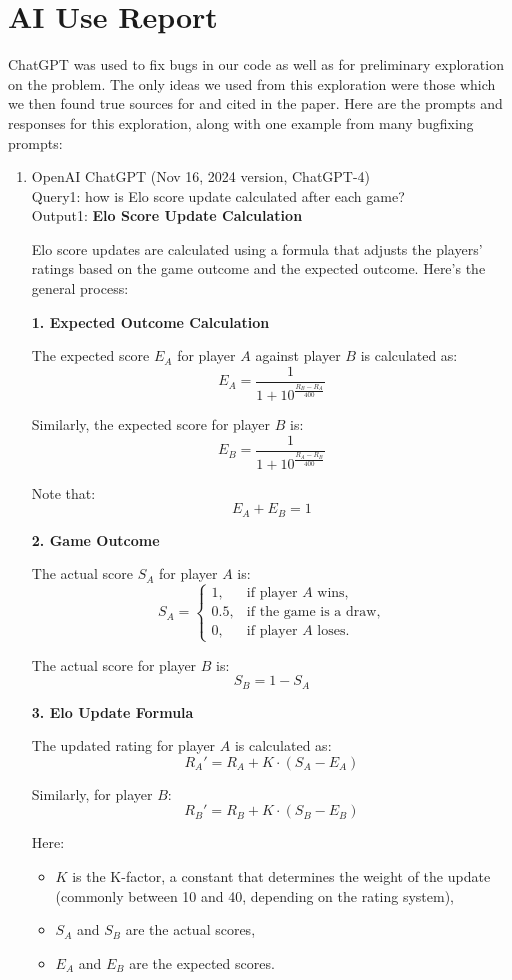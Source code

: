 \section{AI Use Report}
ChatGPT was used to fix bugs in our code as well as for preliminary exploration on the problem. The only ideas we used from this exploration were those which we then found true sources for and cited in the paper. Here are the prompts and responses for this exploration, along with one example from many bugfixing prompts:
\begin{enumerate}
\item OpenAI ChatGPT (Nov 16, 2024 version, ChatGPT-4) \\
Query1: how is Elo score update calculated after each game? \\
Output1: \textbf{Elo Score Update Calculation}

Elo score updates are calculated using a formula that adjusts the players' ratings based on the game outcome and the expected outcome. Here's the general process:

\textbf{1. Expected Outcome Calculation}

The expected score $E_A$ for player $A$ against player $B$ is calculated as:
\[
E_A = \frac{1}{1 + 10^{\frac{R_B - R_A}{400}}}
\]

Similarly, the expected score for player $B$ is:
\[
E_B = \frac{1}{1 + 10^{\frac{R_A - R_B}{400}}}
\]

Note that:
\[
E_A + E_B = 1
\]

\textbf{2. Game Outcome}

The actual score $S_A$ for player $A$ is:
\[
S_A =
\begin{cases}
1, & \text{if player $A$ wins,} \\
0.5, & \text{if the game is a draw,} \\
0, & \text{if player $A$ loses.}
\end{cases}
\]

The actual score for player $B$ is:
\[
S_B = 1 - S_A
\]

\textbf{3. Elo Update Formula}

The updated rating for player $A$ is calculated as:
\[
R_A' = R_A + K \cdot (S_A - E_A)
\]

Similarly, for player $B$:
\[
R_B' = R_B + K \cdot (S_B - E_B)
\]

Here:
\begin{itemize}
    \item $K$ is the K-factor, a constant that determines the weight of the update (commonly between 10 and 40, depending on the rating system),
    \item $S_A$ and $S_B$ are the actual scores,
    \item $E_A$ and $E_B$ are the expected scores.
\end{itemize}


\end{enumerate}
